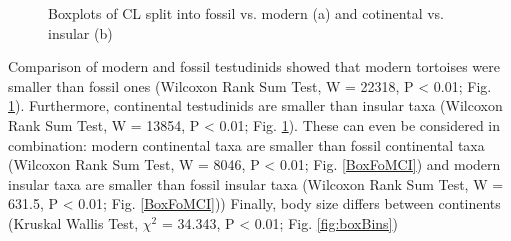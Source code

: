 \begin{center}
	\begin{figure}[H]
		\caption{Boxplots of CL split into fossil vs. modern (a) and cotinental vs. insular (b)}
		\label{fig:boxFMCI}
	\end{figure}
\end{center}


Comparison of modern and fossil testudinids showed that modern tortoises were smaller than fossil ones (Wilcoxon Rank Sum Test, W = 22318, P < 0.01; Fig. \ref{fig:boxFMCI}). Furthermore, continental testudinids are smaller than insular taxa (Wilcoxon Rank Sum Test, W = 13854, P < 0.01; Fig. \ref{fig:boxFMCI}).
These can even be considered in combination: modern continental taxa are smaller than fossil continental taxa (Wilcoxon Rank Sum Test, W = 8046, P < 0.01; Fig. \ref{BoxFoMCI}) and modern insular taxa are smaller than fossil insular taxa (Wilcoxon Rank Sum Test, W = 631.5, P < 0.01; Fig. \ref{BoxFoMCI}))
Finally, body size differs between continents (Kruskal Wallis Test, $\chi^2$ = 34.343, P < 0.01; Fig. \ref{fig:boxBins}) 


